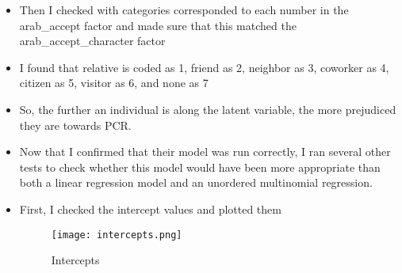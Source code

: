 \documentclass[12pt,letterpaper]{article}
\begin{document}
	\begin{itemize}
		\item Then I checked with categories corresponded to each number in the arab\_accept factor and made sure that this matched the arab\_accept\_character factor
		
		\item I found that relative is coded as 1, friend as 2, neighbor as 3, coworker as 4, citizen as 5, visitor as 6, and none as 7
		\item So, the further an individual is along the latent variable, the more prejudiced they are towards PCR.
		\item Now that I confirmed that their model was run correctly, I ran several other tests to check whether this model would have been more appropriate than both a linear regression model and an unordered multinomial regression.
		\item First, I checked the intercept values and plotted them
		
\begin{figure}[htbp]
	\centering
	\texttt{[image: intercepts.png]} %
	\caption{Intercepts} %
	\label{fig:intercepts}
\end{figure}


\end{itemize}
\end{document}
